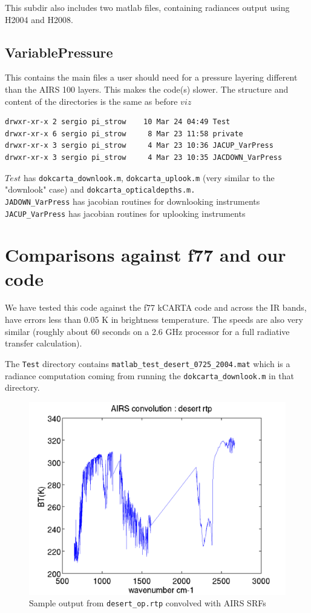 \documentclass[11pt]{article}
\newcommand{\kc}{kCARTA }
\begin{document}
This subdir also includes two matlab files, containing radiances output
using H2004 and H2008.

\subsection{VariablePressure}
This contains the main files a user should need for a 
pressure layering different than the AIRS 100 layers. This makes the code(s)
slower. The structure and content of the directories is the same as before 
$viz$

\begin{verbatim}
drwxr-xr-x 2 sergio pi_strow    10 Mar 24 04:49 Test
drwxr-xr-x 6 sergio pi_strow     8 Mar 23 11:58 private
drwxr-xr-x 3 sergio pi_strow     4 Mar 23 10:36 JACUP_VarPress
drwxr-xr-x 3 sergio pi_strow     4 Mar 23 10:35 JACDOWN_VarPress
\end{verbatim}

\noindent $Test$ has \texttt{dokcarta\_downlook.m}, \texttt{dokcarta\_uplook.m} (very similar to 
the "downlook" case) and \texttt{dokcarta\_opticaldepths.m.}\\

\noindent \texttt{JADOWN\_VarPress} has jacobian routines for downlooking 
instruments\\

\noindent \texttt{JACUP\_VarPress} has jacobian routines for uplooking instruments\\

\section{Comparisons against f77 and our code}
We have tested this code against the f77 \kc code and across the IR bands, 
have errors less than 0.05 K in brightness temperature. The speeds are also
very similar (roughly about 60 seconds on a 2.6 GHz processor for a full
radiative transfer calculation).

The \texttt{Test} directory contains
\texttt{matlab\_test\_desert\_0725\_2004.mat} which is a radiance
computation coming from running the \texttt{dokcarta\_downlook.m} in
that directory.

\begin{figure}
\includegraphics[width=5.5in]{./desert_rtp.png}
\caption{Sample output from \texttt{desert\_op.rtp} convolved with AIRS SRFs}
\end{figure}
\end{document}
